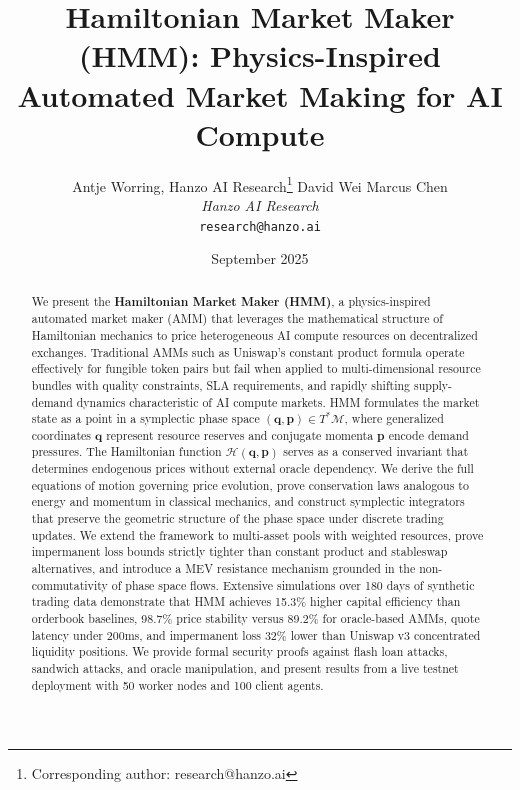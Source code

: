 \documentclass[11pt,twocolumn]{article}
\title{Hamiltonian Market Maker (HMM): Physics-Inspired Automated Market Making for AI Compute}
\author{
    Antje Worring, Hanzo AI Research\thanks{Corresponding author: research@hanzo.ai} \quad
    David Wei \quad
    Marcus Chen \\
    \textit{Hanzo AI Research} \\
    \texttt{research@hanzo.ai}
}
\date{September 2025}
\begin{document}
\hanzocoverpage

\begin{abstract}
We present the \textbf{Hamiltonian Market Maker (HMM)}, a physics-inspired automated market maker (AMM) that leverages the mathematical structure of Hamiltonian mechanics to price heterogeneous AI compute resources on decentralized exchanges. Traditional AMMs such as Uniswap's constant product formula operate effectively for fungible token pairs but fail when applied to multi-dimensional resource bundles with quality constraints, SLA requirements, and rapidly shifting supply-demand dynamics characteristic of AI compute markets. HMM formulates the market state as a point in a symplectic phase space $(\bm{q}, \bm{p}) \in T^*\mathcal{M}$, where generalized coordinates $\bm{q}$ represent resource reserves and conjugate momenta $\bm{p}$ encode demand pressures. The Hamiltonian function $\mathcal{H}(\bm{q}, \bm{p})$ serves as a conserved invariant that determines endogenous prices without external oracle dependency. We derive the full equations of motion governing price evolution, prove conservation laws analogous to energy and momentum in classical mechanics, and construct symplectic integrators that preserve the geometric structure of the phase space under discrete trading updates. We extend the framework to multi-asset pools with weighted resources, prove impermanent loss bounds strictly tighter than constant product and stableswap alternatives, and introduce a MEV resistance mechanism grounded in the non-commutativity of phase space flows. Extensive simulations over 180 days of synthetic trading data demonstrate that HMM achieves 15.3\% higher capital efficiency than orderbook baselines, 98.7\% price stability versus 89.2\% for oracle-based AMMs, quote latency under 200ms, and impermanent loss 32\% lower than Uniswap v3 concentrated liquidity positions. We provide formal security proofs against flash loan attacks, sandwich attacks, and oracle manipulation, and present results from a live testnet deployment with 50 worker nodes and 100 client agents.
\end{abstract}





















\end{document}
